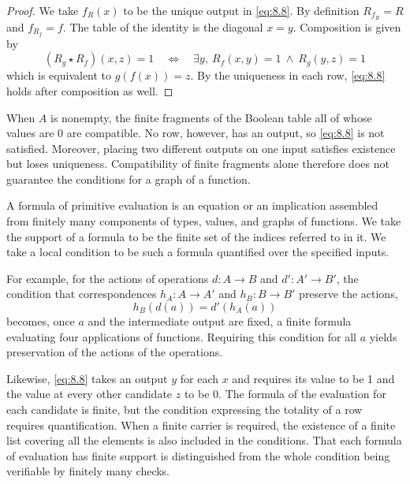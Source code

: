 \begin{proof}

We take $f_R(x)$ to be the unique output in \eqref{eq:8.8}.
By definition $R_{f_R}=R$ and $f_{R_f}=f$.
The table of the identity is the diagonal $x=y$.
Composition is given by
\begin{equation*}
(R_g\star R_f)(x,z)=1
\quad\Longleftrightarrow\quad
\exists y,\ R_f(x,y)=1\ \land\ R_g(y,z)=1
\tag{8.9}\label{eq:8.9}
\end{equation*}
which is equivalent to $g(f(x))=z$.
By the uniqueness in each row, \eqref{eq:8.8} holds after composition as well.

\end{proof}

\begin{example}\label{ex:8.10}

When $A$ is nonempty, the finite fragments of the Boolean table all of whose values are 0 are
compatible.
No row, however, has an output, so \eqref{eq:8.8} is not satisfied.
Moreover, placing two different outputs on one input satisfies existence but loses
uniqueness.
Compatibility of finite fragments alone therefore does not guarantee the conditions for a
graph of a function.

\end{example}

\begin{definition}\label{def:8.11}

A formula of primitive evaluation is an equation or an implication assembled from
finitely many components of types, values, and graphs of functions.
We take the support of a formula to be the finite set of the indices referred to in it.
We take a local condition to be such a formula quantified over the specified inputs.

For example, for the actions of operations $d:A\to B$ and $d':A'\to B'$, the condition that
correspondences $h_A:A\to A'$ and $h_B:B\to B'$ preserve the actions,
\begin{equation*}
h_B(d(a))=d'(h_A(a))
\tag{8.10}\label{eq:8.10}
\end{equation*}
becomes, once $a$ and the intermediate output are fixed, a finite formula evaluating four
applications of functions.
Requiring this condition for all $a$ yields preservation of the actions of the operations.

Likewise, \eqref{eq:8.8} takes an output $y$ for each $x$ and requires its value to be 1 and
the value at every other candidate $z$ to be 0.
The formula of the evaluation for each candidate is finite, but the condition expressing the
totality of a row requires quantification.
When a finite carrier is required, the existence of a finite list covering all the elements
is also included in the conditions.
That each formula of evaluation has finite support is distinguished from the whole condition being verifiable by finitely many checks.

\end{definition}

